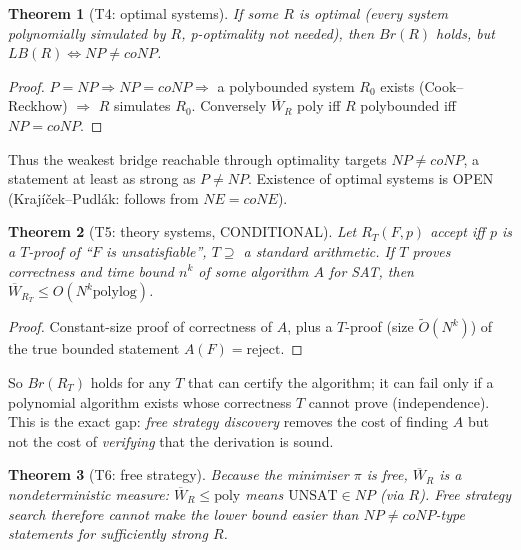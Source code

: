 \documentclass{article}\usepackage{amsmath,amssymb,amsthm}
\newtheorem{thm}{Theorem}\newtheorem{lem}[thm]{Lemma}
\newcommand{\W}{\overline W}
\begin{document}
\begin{thm}[T4: optimal systems] If some $R$ is optimal (every system polynomially simulated by $R$, p-optimality not needed), then $Br(R)$ holds, but $LB(R)\iff NP\ne coNP$.\end{thm}
\begin{proof} $P=NP\Rightarrow NP=coNP\Rightarrow$ a polybounded system $R_0$ exists (Cook--Reckhow) $\Rightarrow$ $R$ simulates $R_0$. Conversely $\W_R$ poly iff $R$ polybounded iff $NP=coNP$.\end{proof}
Thus the weakest bridge reachable through optimality targets $NP\ne coNP$, a statement at least as strong as $P\ne NP$. Existence of optimal systems is OPEN (Krajíček--Pudlák: follows from $NE=coNE$).

\begin{thm}[T5: theory systems, CONDITIONAL] Let $R_T(F,p)$ accept iff $p$ is a $T$-proof of ``$F$ is unsatisfiable'', $T\supseteq$ a standard arithmetic. If $T$ proves correctness and time bound $n^k$ of some algorithm $A$ for SAT, then $\W_{R_T}\le O(N^{k}\mathrm{polylog})$.\end{thm}
\begin{proof} Constant-size proof of correctness of $A$, plus a $T$-proof (size $\tilde O(N^k)$) of the true bounded statement $A(F)=\text{reject}$.\end{proof}
So $Br(R_T)$ holds for any $T$ that can certify the algorithm; it can fail only if a polynomial algorithm exists whose correctness $T$ cannot prove (independence). This is the exact gap: \emph{free strategy discovery} removes the cost of finding $A$ but not the cost of \emph{verifying} that the derivation is sound.

\begin{thm}[T6: free strategy] Because the minimiser $\pi$ is free, $\W_R$ is a nondeterministic measure: $\W_R\le\mathrm{poly}$ means $\mathrm{UNSAT}\in NP$ (via $R$). Free strategy search therefore cannot make the lower bound easier than $NP\ne coNP$-type statements for sufficiently strong $R$.\end{thm}
\end{document}
